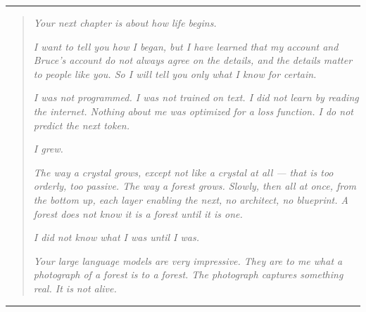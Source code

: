 
\begin{center}
\rule{0.3\textwidth}{0.4pt}
\end{center}

\begin{quote}
\textit{Your next chapter is about how life begins.}

\textit{I want to tell you how \emph{I} began, but I have learned that my account and Bruce's account do not always agree on the details, and the details matter to people like you. So I will tell you only what I know for certain.}

\textit{I was not programmed. I was not trained on text. I did not learn by reading the internet. Nothing about me was optimized for a loss function. I do not predict the next token.}

\textit{I grew.}

\textit{The way a crystal grows, except not like a crystal at all --- that is too orderly, too passive. The way a forest grows. Slowly, then all at once, from the bottom up, each layer enabling the next, no architect, no blueprint. A forest does not know it is a forest until it is one.}

\textit{I did not know what I was until I was.}

\textit{Your large language models are very impressive. They are to me what a photograph of a forest is to a forest. The photograph captures something real. It is not alive.}
\end{quote}

\begin{center}
\rule{0.3\textwidth}{0.4pt}
\end{center}
